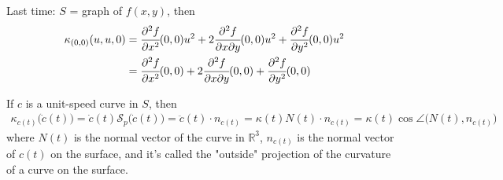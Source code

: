 \documentclass[10pt]{article}
\begin{document}
            \begin{example}
                Last time: $S$ = graph of $f(x,y)$, then
                \begin{equation*}
                    \begin{aligned}
                        \kappa_{(0,0)}(u,u,0) &= \cfrac{\partial^2f}{\partial x^2}(0,0)u^2 + 2\cfrac{\partial^2 f}{\partial x\partial y}(0,0)u^2 + \cfrac{\partial^2 f}{\partial y^2}(0,0)u^2 \\
                        &= \cfrac{\partial^2f}{\partial x^2}(0,0) + 2\cfrac{\partial^2 f}{\partial x\partial y}(0,0) + \cfrac{\partial^2 f}{\partial y^2}(0,0)
                    \end{aligned}
                \end{equation*}
            \end{example}
            \begin{remark}
                If $c$ is a unit-speed curve in $S$, then
                \begin{equation*}
                    \begin{aligned}
                        \kappa_{c(t)}\big(\dot{c}(t)\big) = \dot{c}(t)\mathcal{S}_p\big(\dot{c}(t)\big) = \ddot{c}(t)\cdot n_{c(t)} = \kappa(t)N(t)\cdot n_{c(t)} = \kappa(t)\cos\angle\big(N(t),n_{c(t)}\big)
                    \end{aligned}
                \end{equation*}
                where $N(t)$ is the normal vector of the curve in $\mathbb{R}^3$, $n_{c(t)}$ is the normal vector of $c(t)$ on the surface, and it's called the "outside" projection of the curvature of a curve on the surface.
            \end{remark}
            
\end{document}
